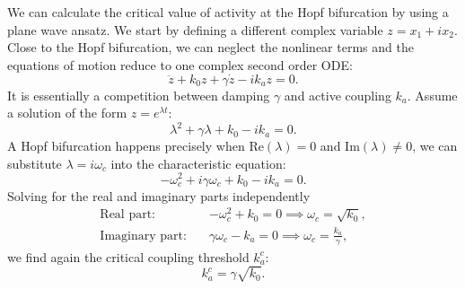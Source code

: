 \documentclass[11pt, a4paper]{article} %
\begin{document}




We can calculate the critical value of activity at the Hopf bifurcation by using a plane wave ansatz.
We start by defining a different complex variable $z = x_1 + i x_2$. 
Close to the Hopf bifurcation, we can neglect the nonlinear terms and the equations of motion reduce to 
one complex second order ODE:
\begin{equation}
\ddot{z} + k_0 z + \gamma \dot{z}  - i k_a z = 0.  %
\end{equation}
It is essentially a competition between damping $\gamma$ and active coupling $k_a$.
Assume a solution of the form $z = e^{\lambda t}$:
\begin{equation}
\lambda^2 + \gamma\lambda + k_0 - i k_a = 0.
\end{equation}
A Hopf bifurcation happens precisely when $\text{Re}(\lambda) = 0$ and $ \text{Im}(\lambda) \neq 0$,
we can substitute $\lambda = i\omega_c$ into the characteristic equation:
\begin{equation}
-\omega_c^2 + i \gamma \omega_c + k_0 - i k_a = 0.
\end{equation}
Solving for the real and imaginary parts independently
\begin{align}
\text{Real part:} \quad & -\omega_c^2 + k_0 = 0 \implies \omega_c = \sqrt{k_0}, \\
\text{Imaginary part:} \quad & \gamma \omega_c - k_a = 0 \implies \omega_c = \frac{k_a}{\gamma},
\end{align}
we find again the critical coupling threshold $k_a^c$:
\begin{equation}
k_a^c = \gamma \sqrt{k_0}.
\end{equation}
\end{document}
